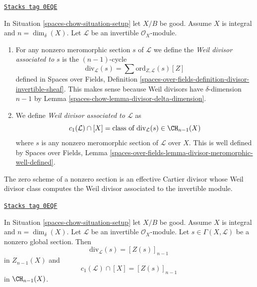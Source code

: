 \begin{definition}
\label{spaces-chow-definition-divisor-invertible-sheaf}
\href{https://stacks.math.columbia.edu/tag/0EQE}{\texttt{Stacks tag 0EQE}}

In Situation \ref{spaces-chow-situation-setup} let $X/B$ be good.
Assume $X$ is integral and $n = \dim_\delta(X)$.
Let $\mathcal{L}$ be an invertible $\mathcal{O}_X$-module.
\begin{enumerate}
\item For any nonzero meromorphic section $s$ of $\mathcal{L}$
we define the {\it Weil divisor associated to $s$} is the
$(n - 1)$-cycle
$$
\text{div}_\mathcal{L}(s) =
\sum \text{ord}_{Z, \mathcal{L}}(s) [Z]
$$
defined in Spaces over Fields, Definition
\ref{spaces-over-fields-definition-divisor-invertible-sheaf}.
This makes sense because Weil divisors have $\delta$-dimension $n - 1$
by Lemma \ref{spaces-chow-lemma-divisor-delta-dimension}.
\item We define {\it Weil divisor associated to $\mathcal{L}$} as
$$
c_1(\mathcal{L}) \cap [X] =
\text{class of }\text{div}_\mathcal{L}(s) \in \CH_{n - 1}(X)
$$
where $s$ is any nonzero meromorphic section of $\mathcal{L}$ over
$X$. This is well defined by
Spaces over Fields, Lemma
\ref{spaces-over-fields-lemma-divisor-meromorphic-well-defined}.
\end{enumerate}
\end{definition}

The zero scheme of a nonzero section is an effective Cartier divisor
whose Weil divisor class computes the Weil divisor associated to
the invertible module.

\begin{lemma}[Compute c1]
\label{spaces-chow-lemma-compute-c1}
\href{https://stacks.math.columbia.edu/tag/0EQF}{\texttt{Stacks tag 0EQF}}

In Situation \ref{spaces-chow-situation-setup} let $X/B$ be good.
Assume $X$ is integral and $n = \dim_\delta(X)$.
Let $\mathcal{L}$ be an invertible $\mathcal{O}_X$-module.
Let $s \in \Gamma(X, \mathcal{L})$ be a nonzero global section.
Then
$$
\text{div}_\mathcal{L}(s) = [Z(s)]_{n - 1}
$$
in $Z_{n - 1}(X)$ and
$$
c_1(\mathcal{L}) \cap [X] = [Z(s)]_{n - 1}
$$
in $\CH_{n - 1}(X)$.
\end{lemma}

